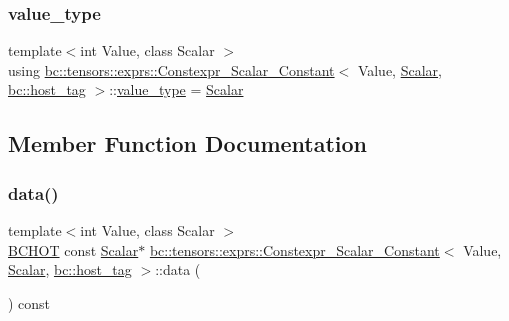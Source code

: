 \subsubsection{\texorpdfstring{value\+\_\+type}{value\_type}}
{\footnotesize\ttfamily template$<$int Value, class Scalar $>$ \\
using \hyperlink{structbc_1_1tensors_1_1exprs_1_1Constexpr__Scalar__Constant}{bc\+::tensors\+::exprs\+::\+Constexpr\+\_\+\+Scalar\+\_\+\+Constant}$<$ Value, \hyperlink{namespacebc_aa12ac55ee2c43dc082894dd3859daee1}{Scalar}, \hyperlink{structbc_1_1host__tag}{bc\+::host\+\_\+tag} $>$\+::\hyperlink{structbc_1_1Shape_3_010_01_4_a342cb50fc2de91d730a07750321bf986}{value\+\_\+type} =  \hyperlink{namespacebc_aa12ac55ee2c43dc082894dd3859daee1}{Scalar}}



\subsection{Member Function Documentation}
\mbox{\label{structbc_1_1tensors_1_1exprs_1_1Constexpr__Scalar__Constant_3_01Value_00_01Scalar_00_01bc_1_1host__tag_01_4_aa54b1a93add44c100995a0facca70cf9}} 
\subsubsection{\texorpdfstring{data()}{data()}}
{\footnotesize\ttfamily template$<$int Value, class Scalar $>$ \\
\hyperlink{common_8h_ac085f07cc309e3aac24aa3fc0a40f6d2}{B\+C\+H\+OT} const \hyperlink{namespacebc_aa12ac55ee2c43dc082894dd3859daee1}{Scalar}$\ast$ \hyperlink{structbc_1_1tensors_1_1exprs_1_1Constexpr__Scalar__Constant}{bc\+::tensors\+::exprs\+::\+Constexpr\+\_\+\+Scalar\+\_\+\+Constant}$<$ Value, \hyperlink{namespacebc_aa12ac55ee2c43dc082894dd3859daee1}{Scalar}, \hyperlink{structbc_1_1host__tag}{bc\+::host\+\_\+tag} $>$\+::data (\begin{DoxyParamCaption}{ }\end{DoxyParamCaption}) const\hspace{0.3cm}{\ttfamily [inline]}}

